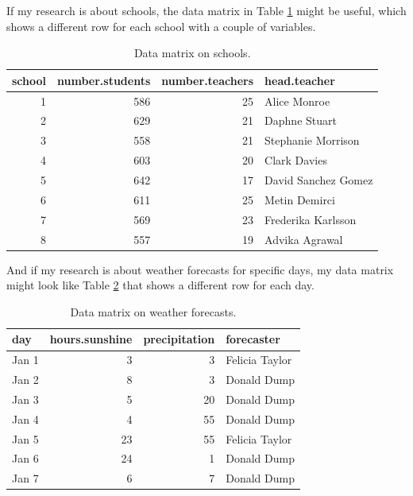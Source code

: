 \documentclass[]{report}\usepackage[]{graphicx}\usepackage[]{color}
\begin{document}
If my research is about schools, the data matrix in Table \ref{tab:data_3} might be useful, which shows a different row for each school with a couple of variables.

\begin{table}[ht]
\centering
\caption{Data matrix on schools.} 
\label{tab:data_3}
\begin{tabular}{rrrl}
  \hline
school & number.students & number.teachers & head.teacher \\ 
  \hline
1 & 586 & 25 & Alice Monroe \\ 
  2 & 629 & 21 & Daphne Stuart \\ 
  3 & 558 & 21 & Stephanie Morrison \\ 
  4 & 603 & 20 & Clark Davies \\ 
  5 & 642 & 17 & David Sanchez Gomez \\ 
  6 & 611 & 25 & Metin Demirci \\ 
  7 & 569 & 23 & Frederika Karlsson \\ 
  8 & 557 & 19 & Advika Agrawal \\ 
   \hline
\end{tabular}
\end{table}



And if my research is about weather forecasts for specific days, my data matrix might look like Table \ref{tab:data_4} that shows a different row for each day.

\begin{table}[ht]
\centering
\caption{Data matrix on weather forecasts.} 
\label{tab:data_4}
\begin{tabular}{lrrl}
  \hline
day & hours.sunshine & precipitation & forecaster \\ 
  \hline
Jan 1 & 3 & 3 & Felicia Taylor \\ 
  Jan 2 & 8 & 3 & Donald Dump \\ 
  Jan 3 & 5 & 20 & Donald Dump \\ 
  Jan 4 & 4 & 55 & Donald Dump \\ 
  Jan 5 & 23 & 55 & Felicia Taylor \\ 
  Jan 6 & 24 & 1 & Donald Dump \\ 
  Jan 7 & 6 & 7 & Donald Dump \\ 
   \hline
\end{tabular}
\end{table}
\end{document}

